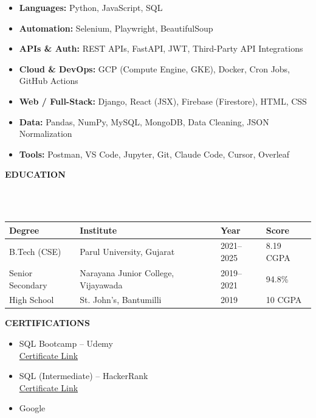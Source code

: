 \documentclass[a4paper,10pt]{article}
\newcommand{\lsep}{-0.5cm}
\newcommand{\resheading}[1]{{\small \colorbox{mygrey}{\begin{minipage}{0.975\textwidth}{\textbf{#1}}\end{minipage}}}}
\begin{document}
\begin{itemize}
\item \textbf{Languages:} Python, JavaScript, SQL
\item \textbf{Automation:} Selenium, Playwright, BeautifulSoup
\item \textbf{APIs \& Auth:} REST APIs, FastAPI, JWT, Third-Party API Integrations
\item \textbf{Cloud \& DevOps:} GCP (Compute Engine, GKE), Docker, Cron Jobs, GitHub Actions
\item \textbf{Web / Full-Stack:} Django, React (JSX), Firebase (Firestore), HTML, CSS
\item \textbf{Data:} Pandas, NumPy, MySQL, MongoDB, Data Cleaning, JSON Normalization
\item \textbf{Tools:} Postman, VS Code, Jupyter, Git, Claude Code, Cursor, Overleaf
\end{itemize}

\resheading{\textbf{EDUCATION}}\\[\lsep]\\

\indent
\begin{tabular}{ p{3cm} @{\hskip 0.15in} p{6cm} @{\hskip 0.15in} p{4cm} @{\hskip 0.15in} p{2cm} }
\toprule
\textbf{Degree} & \textbf{Institute} & \textbf{Year} & \textbf{Score} \\
\midrule
B.Tech (CSE) & Parul University, Gujarat & 2021--2025 & 8.19 CGPA \\
Senior Secondary & Narayana Junior College, Vijayawada & 2019--2021 & 94.8\% \\
High School & St. John's, Bantumilli & 2019 & 10 CGPA \\
\bottomrule
\end{tabular}



\vspace{3mm}

\resheading{\textbf{CERTIFICATIONS}}

\begin{itemize}
\item SQL Bootcamp -- Udemy \\
\href{https://www.udemy.com/certificate/UC-d3b76d22-69b1-45dc-86fd-7a969b920a5e/}{Certificate Link}

\item SQL (Intermediate) -- HackerRank \\
\href{https://www.hackerrank.com/certificates/4e195a7134d8}{Certificate Link}
\item Google
\end{itemize}
\end{document}
